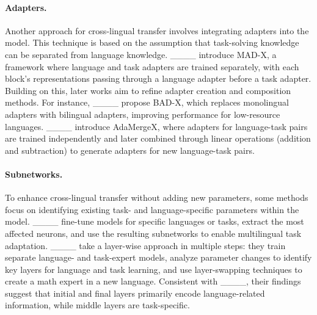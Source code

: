 \paragraph{Adapters.}

Another approach for cross-lingual transfer involves integrating adapters into the model. This technique is based on the assumption that task-solving knowledge can be separated from language knowledge. ____ introduce MAD-X, a framework where language and task adapters are trained separately, with each block’s representations passing through a language adapter before a task adapter. Building on this, later works aim to refine adapter creation and composition methods. For instance, ____ propose BAD-X, which replaces monolingual adapters with bilingual adapters, improving performance for low-resource languages. ____ introduce AdaMergeX, where adapters for language-task pairs are trained independently and later combined through linear operations (addition and subtraction) to generate adapters for new language-task pairs.    



\paragraph{Subnetworks.}

To enhance cross-lingual transfer without adding new parameters, some methods focus on identifying existing task- and language-specific parameters within the model. ____ fine-tune models for specific languages or tasks, extract the most affected neurons, and use the resulting subnetworks to enable multilingual task adaptation. ____ take a layer-wise approach in multiple steps: they train separate language- and task-expert models, analyze parameter changes to identify key layers for language and task learning, and use layer-swapping techniques to create a math expert in a new language. Consistent with ____, their findings suggest that initial and final layers primarily encode language-related information, while middle layers are task-specific.